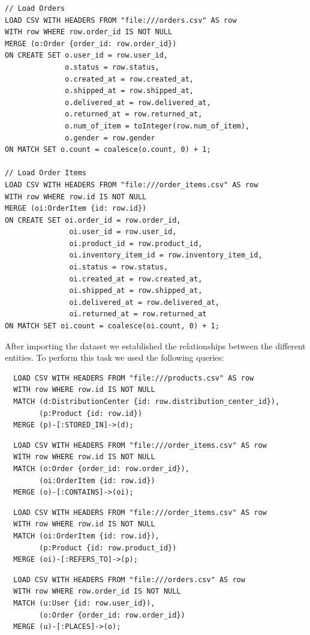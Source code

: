 \documentclass[a4paper,12pt]{article}
\begin{document}
\begin{verbatim}
// Load Orders
LOAD CSV WITH HEADERS FROM "file:///orders.csv" AS row
WITH row WHERE row.order_id IS NOT NULL
MERGE (o:Order {order_id: row.order_id})
ON CREATE SET o.user_id = row.user_id,
              o.status = row.status,
              o.created_at = row.created_at,
              o.shipped_at = row.shipped_at,
              o.delivered_at = row.delivered_at,
              o.returned_at = row.returned_at,
              o.num_of_item = toInteger(row.num_of_item),
              o.gender = row.gender
ON MATCH SET o.count = coalesce(o.count, 0) + 1;

// Load Order Items
LOAD CSV WITH HEADERS FROM "file:///order_items.csv" AS row
WITH row WHERE row.id IS NOT NULL
MERGE (oi:OrderItem {id: row.id})
ON CREATE SET oi.order_id = row.order_id,
               oi.user_id = row.user_id,
               oi.product_id = row.product_id,
               oi.inventory_item_id = row.inventory_item_id,
               oi.status = row.status,
               oi.created_at = row.created_at,
               oi.shipped_at = row.shipped_at,
               oi.delivered_at = row.delivered_at,
               oi.returned_at = row.returned_at
ON MATCH SET oi.count = coalesce(oi.count, 0) + 1;
\end{verbatim}

After importing the dataset we established the relationships between the different entities. To perform this task we used the following queries:
\begin{verbatim}
  LOAD CSV WITH HEADERS FROM "file:///products.csv" AS row
  WITH row WHERE row.id IS NOT NULL
  MATCH (d:DistributionCenter {id: row.distribution_center_id}),
        (p:Product {id: row.id})
  MERGE (p)-[:STORED_IN]->(d);
\end{verbatim}

\begin{verbatim} 
  LOAD CSV WITH HEADERS FROM "file:///order_items.csv" AS row
  WITH row WHERE row.id IS NOT NULL
  MATCH (o:Order {order_id: row.order_id}),
        (oi:OrderItem {id: row.id})
  MERGE (o)-[:CONTAINS]->(oi);
\end{verbatim}

\begin{verbatim}
  LOAD CSV WITH HEADERS FROM "file:///order_items.csv" AS row
  WITH row WHERE row.id IS NOT NULL
  MATCH (oi:OrderItem {id: row.id}),
        (p:Product {id: row.product_id})
  MERGE (oi)-[:REFERS_TO]->(p);
\end{verbatim}

\begin{verbatim} 
  LOAD CSV WITH HEADERS FROM "file:///orders.csv" AS row
  WITH row WHERE row.order_id IS NOT NULL
  MATCH (u:User {id: row.user_id}),
        (o:Order {order_id: row.order_id})
  MERGE (u)-[:PLACES]->(o);
\end{verbatim}
\end{document}
